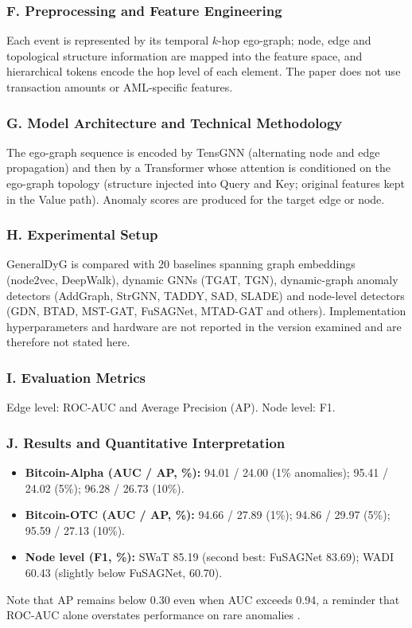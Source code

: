 \documentclass[11pt,a4paper]{article}
\begin{document}
\subsubsection*{F. Preprocessing and Feature Engineering}
Each event is represented by its temporal $k$-hop ego-graph; node, edge and topological structure information are mapped into the feature space, and hierarchical tokens encode the hop level of each element. The paper does not use transaction amounts or AML-specific features.

\subsubsection*{G. Model Architecture and Technical Methodology}
The ego-graph sequence is encoded by TensGNN (alternating node and edge propagation) and then by a Transformer whose attention is conditioned on the ego-graph topology (structure injected into Query and Key; original features kept in the Value path). Anomaly scores are produced for the target edge or node.

\subsubsection*{H. Experimental Setup}
GeneralDyG is compared with 20 baselines spanning graph embeddings (node2vec, DeepWalk), dynamic GNNs (TGAT, TGN), dynamic-graph anomaly detectors (AddGraph, StrGNN, TADDY, SAD, SLADE) and node-level detectors (GDN, BTAD, MST-GAT, FuSAGNet, MTAD-GAT and others). Implementation hyperparameters and hardware are not reported in the version examined and are therefore not stated here.

\subsubsection*{I. Evaluation Metrics}
Edge level: ROC-AUC and Average Precision (AP). Node level: F1.

\subsubsection*{J. Results and Quantitative Interpretation}
\begin{itemize}[leftmargin=*]
    \item \textbf{Bitcoin-Alpha (AUC / AP, \%):} 94.01 / 24.00 (1\% anomalies); 95.41 / 24.02 (5\%); 96.28 / 26.73 (10\%).
    \item \textbf{Bitcoin-OTC (AUC / AP, \%):} 94.66 / 27.89 (1\%); 94.86 / 29.97 (5\%); 95.59 / 27.13 (10\%).
    \item \textbf{Node level (F1, \%):} SWaT 85.19 (second best: FuSAGNet 83.69); WADI 60.43 (slightly below FuSAGNet, 60.70).
\end{itemize}
Note that AP remains below 0.30 even when AUC exceeds 0.94, a reminder that ROC-AUC alone overstates performance on rare anomalies \cite{saito2015prroc}.
\end{document}
